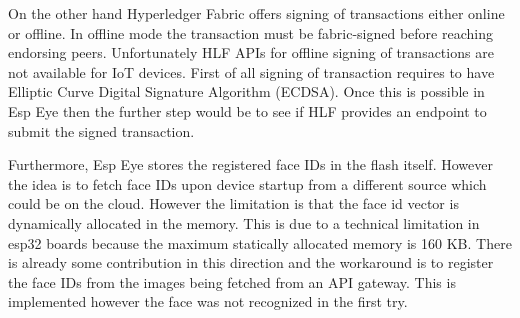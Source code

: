On the other hand Hyperledger Fabric offers signing of transactions either online or offline. In offline mode the transaction must be fabric-signed before reaching endorsing peers. Unfortunately HLF APIs for offline signing of transactions are not available for IoT devices. First of all signing of transaction requires to have Elliptic Curve Digital Signature Algorithm (ECDSA). Once this is possible in Esp Eye then the further step would be to see if HLF provides an endpoint to submit the signed transaction. 

Furthermore, Esp Eye stores the registered face IDs in the flash itself. However the idea is to fetch face IDs upon device startup from a different source which could be on the cloud. However the limitation is that the face id vector is dynamically allocated in the memory. This is due to a technical limitation in esp32 boards because the maximum statically allocated memory is 160 KB. 
There is already some contribution in this direction and the workaround is to register the face IDs from the images being fetched from an API gateway. This is implemented however the face was not recognized in the first try. 
